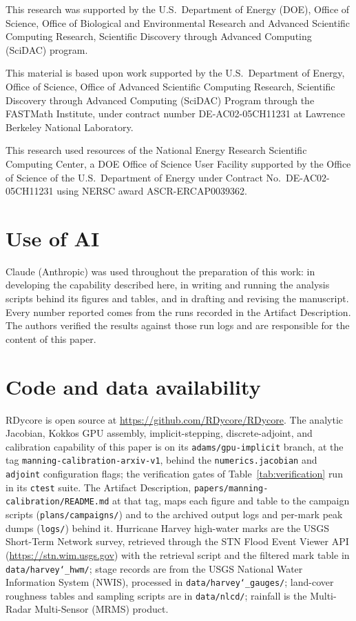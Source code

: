 \documentclass[11pt]{article}
\begin{document}
This research was supported by the U.S.\ Department of Energy (DOE),
Office of Science, Office of Biological and Environmental Research and
Advanced Scientific Computing Research, Scientific Discovery through
Advanced Computing (SciDAC) program.

This material is based upon work supported by the U.S.\ Department of
Energy, Office of Science, Office of Advanced Scientific Computing
Research, Scientific Discovery through Advanced Computing (SciDAC)
Program through the FASTMath Institute, under contract number
DE-AC02-05CH11231 at Lawrence Berkeley National Laboratory.

This research used resources of the National Energy Research
Scientific Computing Center, a DOE Office of Science User Facility
supported by the Office of Science of the U.S.\ Department of Energy
under Contract No.\ DE-AC02-05CH11231 using NERSC award
ASCR-ERCAP0039362.

\section*{Use of AI}
Claude (Anthropic) was used throughout the preparation of this work: in
developing the capability described here, in writing and running the
analysis scripts behind its figures and tables, and in drafting and
revising the manuscript. Every number reported comes from the runs
recorded in the Artifact Description. The authors verified the results
against those run logs and are responsible for the content of this
paper.

\section*{Code and data availability}
RDycore is open source at \url{https://github.com/RDycore/RDycore}. The
analytic Jacobian, Kokkos GPU assembly, implicit-stepping, discrete-adjoint,
and calibration capability of this paper is on its
\texttt{adams/gpu-implicit} branch, at the tag
\texttt{manning-calibration-arxiv-v1}, behind the
\texttt{numerics.jacobian} and \texttt{adjoint} configuration flags;
the verification gates of Table~\ref{tab:verification} run in its
\texttt{ctest} suite. The Artifact Description,
\texttt{papers/manning-calibration/README.md} at that tag, maps each
figure and table to the campaign scripts (\texttt{plans/campaigns/}) and
to the archived output logs and per-mark peak dumps (\texttt{logs/})
behind it. Hurricane Harvey
high-water marks are the USGS Short-Term Network survey, retrieved
through the STN Flood Event Viewer API (\url{https://stn.wim.usgs.gov})
with the retrieval script and the filtered mark table in
\texttt{data/harvey\char`\_hwm/}; stage records are from the USGS National
Water Information System (NWIS), processed in
\texttt{data/harvey\char`\_gauges/}; land-cover roughness tables and sampling
scripts are in \texttt{data/nlcd/}; rainfall is the Multi-Radar
Multi-Sensor (MRMS) product.



\end{document}
